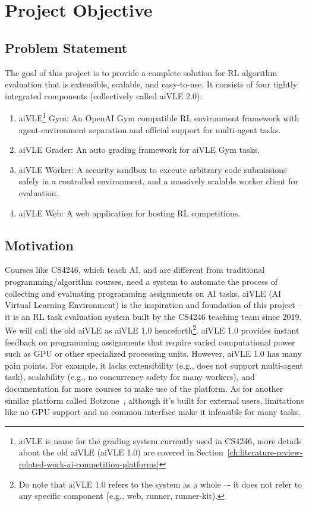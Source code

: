 \chapter{Project Objective}
\label{ch:project-objective}
\section{Problem Statement}
\label{s:project-objective-problem-statement}
The goal of this project is to provide a complete solution for RL algorithm evaluation that is extensible, scalable, and easy-to-use. It consists of four tightly integrated components (collectively called aiVLE 2.0):

\begin{enumerate}
    \item aiVLE\footnote{aiVLE is name for the grading system currently used in CS4246, more details about the old aiVLE (aiVLE 1.0) are covered in Section~\ref{ch:literature-review-related-work-ai-competition-platforms}} Gym: An OpenAI Gym \cite{openai-gym} compatible RL environment framework with agent-environment separation and official support for multi-agent tasks.
    \item aiVLE Grader: An auto grading framework for aiVLE Gym tasks.
    \item aiVLE Worker: A security sandbox to execute arbitrary code submissions safely in a controlled environment, and a massively scalable worker client for evaluation.
    \item aiVLE Web: A web application for hosting RL competitions.
\end{enumerate}

\section{Motivation}
\label{s:project-objective-motivation}
Courses like CS4246, which teach AI, and are different from traditional programming/algorithm courses, need a system to automate the process of collecting and evaluating programming assignments on AI tasks. aiVLE (AI Virtual Learning Environment) is the inspiration and foundation of this project – it is an RL task evaluation system built by the CS4246 teaching team since 2019. We will call the old aiVLE as aiVLE 1.0 henceforth\footnote{Do note that aiVLE 1.0 refers to the system as a whole –- it does not refer to any specific component (e.g., web, runner, runner-kit).}. aiVLE 1.0 provides instant feedback on programming assignments that require varied computational power such as GPU or other specialized processing units. However, aiVLE 1.0 has many pain points. For example, it lacks extensibility (e.g., does not support multi-agent task), scalability (e.g., no concurrency safety for many workers), and documentation for more courses to make use of the platform. As for another similar platform called Botzone~\cite{botzone}, although it’s built for external users, limitations like no GPU support and no common interface make it infeasible for many tasks.

